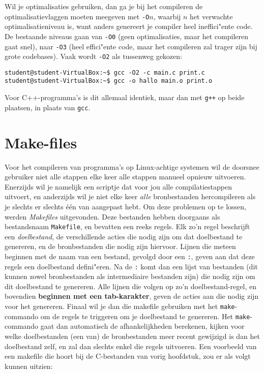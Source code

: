 \documentclass[a4paper,twoside,openany]{memoir}
\begin{document}
Wil je optimalisaties gebruiken, dan ga je bij het compileren de
optimalisatievlaggen moeten meegeven met \verb!-O!$n$, waarbij $n$ het verwachte
optimalisatieniveau is, want anders genereert je compiler heel ineffici"ente
code. De bestaande niveaus gaan van \verb!-O0! (geen optimalisaties, maar het
compileren gaat snel), naar \verb!-O3! (heel effici"ente code, maar het
compileren zal trager zijn bij grote codebases). Vaak wordt \verb!-O2! als
tussenweg gekozen:
\begin{verbatim}
student@student-VirtualBox:~$ gcc -O2 -c main.c print.c 
student@student-VirtualBox:~$ gcc -o hallo main.o print.o
\end{verbatim}

Voor C++-programma's is dit allemaal identiek, maar dan met \verb!g++! op beide
plaatsen, in plaats van \verb!gcc!.

\chapter{Make-files}

Voor het compileren van programma's op Linux-achtige systemen wil de doorsnee
gebruiker niet alle stappen elke keer alle stappen manueel opnieuw uitvoeren.
Enerzijds wil je namelijk een scriptje dat voor jou alle compilatiestappen
uitvoert, en anderzijds wil je niet elke keer \emph{alle} bronbestanden
hercompileren als je slechts er slechts één van aangepast hebt. Om deze
problemen op te lossen, werden \emph{Makefiles} uitgevonden. Deze bestanden
hebben doorgaans als bestandsnaam \verb!Makefile!, en bevatten een reeks regels.
Elk zo'n regel beschrijft een \emph{doelbestand}, de verschillende acties die
nodig zijn om dat doelbestand te genereren, en de bronbestanden die nodig zijn
hiervoor. Lijnen die meteen beginnen met de naam van een bestand, gevolgd door
een \verb!:!, geven aan dat deze regels een doelbestand defini"eren. Na de
\verb!:! komt dan een lijst van bestanden (dit kunnen zowel bronbestanden als
intermediaire bestanden zijn) die nodig zijn om dit doelbestand te genereren.
Alle lijnen die volgen op zo'n doelbestand-regel, en bovendien \textbf{beginnen
met een tab-karakter}, geven de acties aan die nodig zijn voor het genereren.
Finaal wil je dan die makefile gebruiken met het \verb!make!-commando om de
regels te triggeren om je doelbestand te genereren. Het \verb!make!-commando
gaat dan automatisch de afhankelijkheden berekenen, kijken voor welke
doelbestanden (een van) de bronbestanden meer recent gewijzigd is dan het
doelbestand zelf, en zal dan slechts enkel die regels uitvoeren. Een voorbeeld
van een makefile die hoort bij de C-bestanden van vorig hoofdstuk, zou er als
volgt kunnen uitzien:
\end{document}
